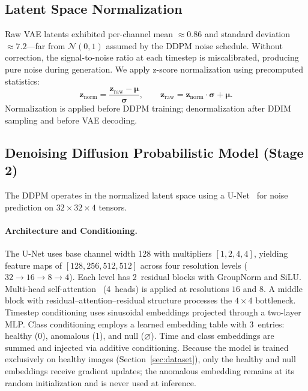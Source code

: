 \documentclass[graybox]{svmult}
\begin{document}
\subsection{Latent Space Normalization}
\label{sec:normalization}

Raw VAE latents exhibited per-channel mean $\approx 0.86$ and standard deviation $\approx 7.2$---far from $\mathcal{N}(0, 1)$ assumed by the DDPM noise schedule. Without correction, the signal-to-noise ratio at each timestep is miscalibrated, producing pure noise during generation. We apply z-score normalization using precomputed statistics:
\begin{equation}
\mathbf{z}_{\text{norm}} = \frac{\mathbf{z}_{\text{raw}} - \boldsymbol{\mu}}{\boldsymbol{\sigma}}, \qquad
\mathbf{z}_{\text{raw}} = \mathbf{z}_{\text{norm}} \cdot \boldsymbol{\sigma} + \boldsymbol{\mu}.
\label{eq:normalization}
\end{equation}
Normalization is applied before DDPM training; denormalization after DDIM sampling and before VAE decoding.

\subsection{Denoising Diffusion Probabilistic Model (Stage 2)}
\label{sec:ddpm}

The DDPM operates in the normalized latent space using a U-Net~\cite{ronneberger2015u} for noise prediction on $32 \times 32 \times 4$ tensors.

\paragraph{Architecture and Conditioning.} The U-Net uses base channel width 128 with multipliers $[1, 2, 4, 4]$, yielding feature maps of $[128, 256, 512, 512]$ across four resolution levels ($32 \rightarrow 16 \rightarrow 8 \rightarrow 4$). Each level has 2~residual blocks with GroupNorm and SiLU. Multi-head self-attention~\cite{vaswani2017attention} (4~heads) is applied at resolutions $16$ and $8$. A middle block with residual--attention--residual structure processes the $4 \times 4$ bottleneck. Timestep conditioning uses sinusoidal embeddings projected through a two-layer MLP. Class conditioning employs a learned embedding table with 3~entries: healthy (0), anomalous (1), and null ($\varnothing$). Time and class embeddings are summed and injected via additive conditioning. Because the model is trained exclusively on healthy images (Section~\ref{sec:dataset}), only the healthy and null embeddings receive gradient updates; the anomalous embedding remains at its random initialization and is never used at inference.
\end{document}
